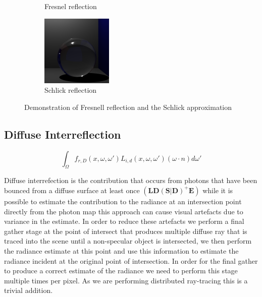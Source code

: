 \begin{figure}[h]
\begin{subfigure}[b]{0.3\textwidth}
	\caption{Fresnel reflection}
\end{subfigure}
\begin{subfigure}[b]{0.3\textwidth}
	\includegraphics[width=\textwidth]{./images/renders/refraction/render-schlick.png}
	\caption{Schlick reflection}
\end{subfigure}
\caption{Demonstration of Fresnell reflection and the Schlick approximation}
\label{fig:shlick-compare}
\end{figure}

\subsection{Diffuse Interreflection}
\begin{equation*}
		\int_{\Omega}
			f_{r,D}(x, \omega, \omega')
			L_{i,d}(x,\omega,\omega')
			(\omega \cdot n)d\omega'
\end{equation*}

Diffuse interrefection is the contribution that occurs from photons that have been bounced from a diffuse surface at least once
$(\mathbf{LD(S|D)^+E})$ while it is possible to estimate the contribution to the radiance at an intersection point directly from the photon map this
approach can cause visual artefacts due to variance in the estimate. In order to reduce these artefacts we perform a final gather
stage at the point of intersect that produces multiple diffuse ray that is traced into the scene until a non-specular object is intersected,
we then perform the radiance estimate at this point and use this information to estimate the radiance incident at the original point of
intersection.  In order for the final gather to produce a correct estimate of the radiance we need to perform this stage multiple times per pixel.
As we are performing distributed ray-tracing this is a trivial addition.

